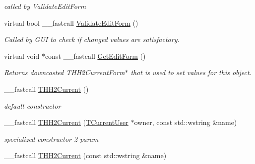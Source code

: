 \begin{DoxyCompactItemize}
\begin{DoxyCompactList}\small\item\em called by Validate\+Edit\+Form \end{DoxyCompactList}\item 
\hypertarget{class_t_h_h2_current_a298c47cdbab3a2d6054a60d5f433edad}{virtual bool \+\_\+\+\_\+fastcall \hyperlink{class_t_h_h2_current_a298c47cdbab3a2d6054a60d5f433edad}{Validate\+Edit\+Form} ()}\label{class_t_h_h2_current_a298c47cdbab3a2d6054a60d5f433edad}

\begin{DoxyCompactList}\small\item\em Called by G\+U\+I to check if changed values are satisfactory. \end{DoxyCompactList}\item 
\hypertarget{class_t_h_h2_current_a8b78e8e4d6abfe5bac5a8ac256b4e093}{virtual void $\ast$const \+\_\+\+\_\+fastcall \hyperlink{class_t_h_h2_current_a8b78e8e4d6abfe5bac5a8ac256b4e093}{Get\+Edit\+Form} ()}\label{class_t_h_h2_current_a8b78e8e4d6abfe5bac5a8ac256b4e093}

\begin{DoxyCompactList}\small\item\em Returns downcasted T\+H\+H2\+Current\+Form$\ast$ that is used to set values for this object. \end{DoxyCompactList}\item 
\hypertarget{class_t_h_h2_current_ae4d594c506bc6d3eee893604f9aca42b}{\+\_\+\+\_\+fastcall \hyperlink{class_t_h_h2_current_ae4d594c506bc6d3eee893604f9aca42b}{T\+H\+H2\+Current} ()}\label{class_t_h_h2_current_ae4d594c506bc6d3eee893604f9aca42b}

\begin{DoxyCompactList}\small\item\em default constructor \end{DoxyCompactList}\item 
\hypertarget{class_t_h_h2_current_a5fba01d48ccc786ce4328b56019b7c86}{\+\_\+\+\_\+fastcall \hyperlink{class_t_h_h2_current_a5fba01d48ccc786ce4328b56019b7c86}{T\+H\+H2\+Current} (\hyperlink{class_t_current_user}{T\+Current\+User} $\ast$owner, const std\+::wstring \&name)}\label{class_t_h_h2_current_a5fba01d48ccc786ce4328b56019b7c86}

\begin{DoxyCompactList}\small\item\em specialized constructor 2 param \end{DoxyCompactList}\item 
\hypertarget{class_t_h_h2_current_a3886e41d5332d15992aedf3cbfd8d099}{\+\_\+\+\_\+fastcall \hyperlink{class_t_h_h2_current_a3886e41d5332d15992aedf3cbfd8d099}{T\+H\+H2\+Current} (const std\+::wstring \&name)}\label{class_t_h_h2_current_a3886e41d5332d15992aedf3cbfd8d099}


\end{DoxyCompactItemize}
